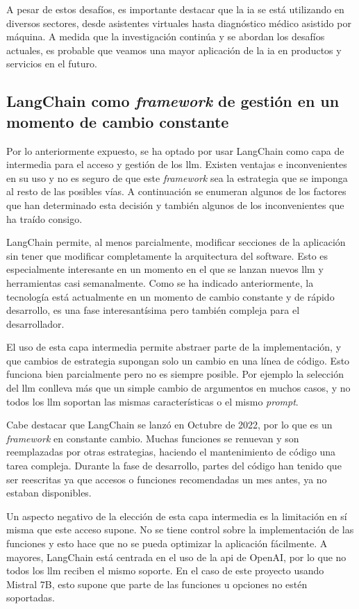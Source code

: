 A pesar de estos desafíos, es importante destacar que la \acrshort{ia} se está utilizando en diversos sectores, desde asistentes virtuales hasta diagnóstico médico asistido por máquina. A medida que la investigación continúa y se abordan los desafíos actuales, es probable que veamos una mayor aplicación de la \acrshort{ia} en productos y servicios en el futuro.

\subsection{LangChain como \textit{framework} de gestión en un momento de cambio constante}

Por lo anteriormente expuesto, se ha optado por usar LangChain como capa de intermedia para el acceso y gestión de los \acrshort{llm}. Existen ventajas e inconvenientes en su uso y no es seguro de que este \textit{framework} sea la estrategia que se imponga al resto de las posibles vías. A continuación se enumeran algunos de los factores que han determinado esta decisión y también algunos de los inconvenientes que ha traído consigo.

LangChain permite, al menos parcialmente, modificar secciones de la aplicación sin tener que modificar completamente la arquitectura del software. Esto es especialmente interesante en un momento en el que se lanzan nuevos \acrshort{llm} y herramientas casi semanalmente. Como se ha indicado anteriormente, la tecnología está actualmente en un momento de cambio constante y de rápido desarrollo, es una fase interesantísima pero también compleja para el desarrollador. 

El uso de esta capa intermedia permite abstraer parte de la implementación, y que cambios de estrategia supongan solo un cambio en una línea de código. Esto funciona bien parcialmente pero no es siempre posible. Por ejemplo la selección del \acrshort{llm} conlleva más que un simple cambio de argumentos en muchos casos, y no todos los \acrshort{llm} soportan las mismas características o el mismo \textit{prompt}.

Cabe destacar que LangChain se lanzó en Octubre de 2022, por lo que es un \textit{framework} en constante cambio. Muchas funciones se renuevan y son reemplazadas por otras estrategias, haciendo el mantenimiento de código una tarea compleja. Durante la fase de desarrollo, partes del código han tenido que ser reescritas ya que accesos o funciones recomendadas un mes antes, ya no estaban disponibles.

Un aspecto negativo de la elección de esta capa intermedia es la limitación en sí misma que este acceso supone. No se tiene control sobre la implementación de las funciones y esto hace que no se pueda optimizar la aplicación fácilmente. A mayores, LangChain está centrada en el uso de la \acrshort{api} de OpenAI, por lo que no todos los \acrshort{llm} reciben el mismo soporte. En el caso de este proyecto usando Mistral 7B, esto supone que parte de las funciones u opciones no estén soportadas.

